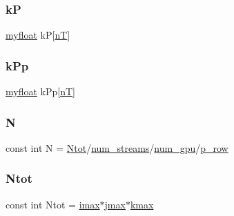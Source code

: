 \subsubsection{\texorpdfstring{kP}{kP}}
{\footnotesize\ttfamily \hyperlink{param_8h_a5f097c9f3873af7be7fc156e6a06ca5e}{myfloat} kP\mbox{[}\hyperlink{NarrowBand_8h_a11e43991170d325cb21737c8e7d5acaa}{nT}\mbox{]}}

\mbox{\label{mc__gpu_8cu_a0eb715a1a15f62d859469e88a101e666}} 
\subsubsection{\texorpdfstring{k\+Pp}{kPp}}
{\footnotesize\ttfamily \hyperlink{param_8h_a5f097c9f3873af7be7fc156e6a06ca5e}{myfloat} k\+Pp\mbox{[}\hyperlink{NarrowBand_8h_a11e43991170d325cb21737c8e7d5acaa}{nT}\mbox{]}}

\mbox{\label{mc__gpu_8cu_ab2b6b0c222cd1ce70d6a831f57241e59}} 
\subsubsection{\texorpdfstring{N}{N}}
{\footnotesize\ttfamily const int N = \hyperlink{mc__gpu_8cu_aa6db95efdd74f7ed82aec0509a3c6079}{Ntot}/\hyperlink{param_8h_ad38ac11e843c3ad8714da6e5599cd1fb}{num\+\_\+streams}/\hyperlink{param_8h_a31fefa6ddf1551a61e2cf79a379ff797}{num\+\_\+gpu}/\hyperlink{param_8h_a149afb59990224def797b29467985bac}{p\+\_\+row}}

\mbox{\label{mc__gpu_8cu_aa6db95efdd74f7ed82aec0509a3c6079}} 
\subsubsection{\texorpdfstring{Ntot}{Ntot}}
{\footnotesize\ttfamily const int Ntot = \hyperlink{param_8h_a788916a7426baf172c67386359720d6d}{imax}$\ast$\hyperlink{param_8h_ac5c80d846ec0c4cf1c91fc5d9d66faa1}{jmax}$\ast$\hyperlink{param_8h_ae0453dd20a7c6a923904df942ef82468}{kmax}}

\mbox{\label{mc__gpu_8cu_a19c66f36e67229ffc84148aa337bc329}} 
